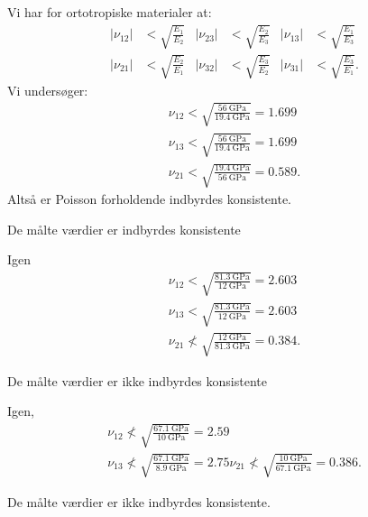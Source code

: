 \begin{derivation}
  \derivationpart
    Vi har for ortotropiske materialer at:
    \begin{align*}
      \left| \nu_{12} \right| &< \sqrt{\frac{E_1}{E_2}} & \left| \nu_{23} \right| &< \sqrt{\frac{E_2}{E_3}} & \left| \nu_{13} \right| &< \sqrt{\frac{E_1}{E_3}} \\
      \left| \nu_{21} \right| &< \sqrt{\frac{E_2}{E_1}} & \left| \nu_{32} \right| &< \sqrt{\frac{E_3}{E_2}} & \left| \nu_{31} \right| &< \sqrt{\frac{E_3}{E_1}}
    .\end{align*}
    Vi undersøger:
    \begin{gather*}
    \nu_{12} < \sqrt{\frac{\qty{56}{\GPa}}{\qty{19,4}{\GPa} }} = \num{1.699}\\
    \nu_{13} < \sqrt{\frac{\qty{56}{\GPa}}{\qty{19,4}{\GPa}}} = \num{1,699} \\
  \nu_{21} < \sqrt{\frac{\qty{19,4}{\GPa}}{\qty{56}{\GPa}}} = \num{0.589}
    .\end{gather*}
    Altså er Poisson forholdende indbyrdes konsistente.

    \begin{subresult}
      De målte værdier er indbyrdes konsistente
    \end{subresult}

  \derivationpart
    Igen
    \begin{gather*}
      \nu_{12} < \sqrt{\frac{\qty{81,3}{\GPa}}{\qty{12}{\GPa}}} = \num{2.603} \\
      \nu_{13} < \sqrt{\frac{\qty{81,3}{\GPa}}{\qty{12}{\GPa}}} = \num{2.603} \\
      \nu_{21} \not< \sqrt{\frac{\qty{12}{\GPa}}{\qty{81,3}{\GPa}}} = \num{0.384}
    .\end{gather*}

    \begin{subresult}
      De målte værdier er ikke indbyrdes konsistente
    \end{subresult}

  \derivationpart
    Igen,
    \begin{gather*}
      \nu_{12} \not< \sqrt{\frac{\qty{67,1}{\GPa}}{\qty{10}{\GPa} }} = \num{2.59} \\
      \nu_{13} \not< \sqrt{\frac{\qty{67,1}{\GPa}}{\qty{8,9}{\GPa}}} = \num{2.75}    
      \nu_{21} \not< \sqrt{\frac{\qty{10}{\GPa}}{\qty{67,1}{\GPa}}} = \num{0.386}
    .\end{gather*}

    \begin{subresult}
      De målte værdier er ikke indbyrdes konsistente.
    \end{subresult}
\end{derivation}

